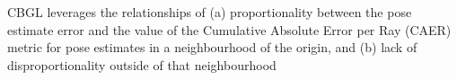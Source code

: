 \lipsum[1]
CBGL leverages the relationships of (a) proportionality between the pose
estimate error and the value of the Cumulative Absolute Error per Ray (CAER)
metric for pose estimates in a neighbourhood of the origin, and (b) lack of
disproportionality outside of that neighbourhood
